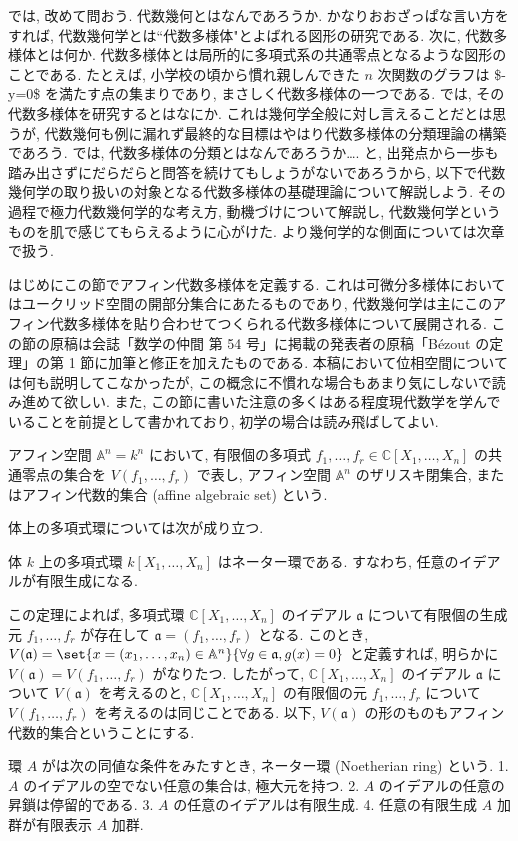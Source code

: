 \documentclass[openany, a4paper, oneside]{jsbook}
\begin{document}
では, 改めて問おう.
代数幾何とはなんであろうか.
かなりおおざっぱな言い方をすれば, 代数幾何学とは``代数多様体"とよばれる図形の研究である.
次に, 代数多様体とは何か.
代数多様体とは局所的に多項式系の共通零点となるような図形のことである.
たとえば, 小学校の頃から慣れ親しんできた $n$ 次関数のグラフは \$-y=0\$ を満たす点の集まりであり,
まさしく代数多様体の一つである.
では, その代数多様体を研究するとはなにか.
これは幾何学全般に対し言えることだとは思うが, 代数幾何も例に漏れず最終的な目標はやはり代数多様体の分類理論の構築であろう.
では, 代数多様体の分類とはなんであろうか\dots{}.
と, 出発点から一歩も踏み出さずにだらだらと問答を続けてもしょうがないであろうから,
以下で代数幾何学の取り扱いの対象となる代数多様体の基礎理論について解説しよう.
その過程で極力代数幾何学的な考え方, 動機づけについて解説し, 代数幾何学というものを肌で感じてもらえるように心がけた.
より幾何学的な側面については次章で扱う.

はじめにこの節でアフィン代数多様体を定義する.
これは可微分多様体においてはユークリッド空間の開部分集合にあたるものであり,
代数幾何学は主にこのアフィン代数多様体を貼り合わせてつくられる代数多様体について展開される.
この節の原稿は会誌「数学の仲間 第 54 号」に掲載の発表者の原稿「B\'ezout の定理」の第 1 節に加筆と修正を加えたものである.
本稿において位相空間については何も説明してこなかったが,
この概念に不慣れな場合もあまり気にしないで読み進めて欲しい.
また, この節に書いた注意の多くはある程度現代数学を学んでいることを前提として書かれており, 初学の場合は読み飛ばしてよい.

\begin{defn}[アフィン代数的集合]
アフィン空間 $\mathbb{A}^n = k^n$ において,
有限個の多項式 $f_1, \dots, f_r \in \mathbb{C}[X_1, \dots, X_n]$ の共通零点の集合を
$V (f_1, \dots, f_r)$ で表し, アフィン空間 $\mathbb{A}^n$ のザリスキ閉集合,
またはアフィン代数的集合 (affine algebraic set) という. \fin
\end{defn}\label{waheyhey-algebraic-geometry-guidance2}
体上の多項式環については次が成り立つ.
\begin{thm}[ヒルベルトの基底定理]
体 $k$ 上の多項式環 $k[X_1, \dots, X_n]$ はネーター環である.
すなわち, 任意のイデアルが有限生成になる. \fin
\end{thm}
この定理によれば, 多項式環 $\mathbb{C}[X_1, \dots, X_n]$ のイデアル $\mathfrak{a}$
について有限個の生成元 ${f_1, \dots, f_r}$ が存在して $\mathfrak{a}=(f_1, \dots, f_r)$ となる.
このとき, $V (\mathfrak{a}) = \set{x = (x_1, \dots, x_n) \in \mathbb{A}^n}{\forall g \in \mathfrak{a}, g (x)=0}$
と定義すれば, 明らかに $V ( \mathfrak{a} ) = V (f_1, \dots, f_r)$ がなりたつ.
したがって, $\mathbb{C}[X_1, \dots, X_n]$ のイデアル $\mathfrak{a}$ について $V ( \mathfrak{a} )$ を考えるのと,
$\mathbb{C}[X_1, \dots, X_n]$ の有限個の元 $ f_1, \dots, f_r $ について $V (f_1, \dots, f_r)$ を考えるのは同じことである.
以下, $V ( \mathfrak{a} )$ の形のものもアフィン代数的集合ということにする.
\begin{rem}
環 $A$ がは次の同値な条件をみたすとき, ネーター環 (Noetherian ring) という.
1. $A$ のイデアルの空でない任意の集合は, 極大元を持つ.
2. $A$ のイデアルの任意の昇鎖は停留的である.
3. $A$ の任意のイデアルは有限生成.
4. 任意の有限生成 $A$ 加群が有限表示 $A$ 加群. \fin
\end{rem}
\end{document}
